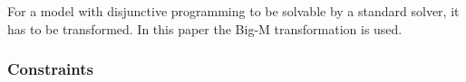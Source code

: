 For a model with disjunctive programming to be solvable by a standard solver,
it has to be transformed.
In this paper the Big-M transformation is used.
\cite{Trespalacios2015}

\subsubsection{Constraints}

